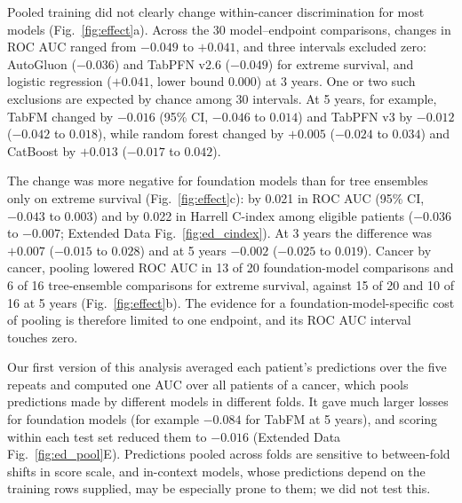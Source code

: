 Pooled training did not clearly change within-cancer discrimination for most models (Fig.~\ref{fig:effect}a). Across the 30 model--endpoint comparisons, changes in ROC AUC ranged from $-0.049$ to $+0.041$, and three intervals excluded zero: AutoGluon ($-0.036$) and TabPFN v2.6 ($-0.049$) for extreme survival, and logistic regression ($+0.041$, lower bound 0.000) at 3 years. One or two such exclusions are expected by chance among 30 intervals. At 5 years, for example, TabFM changed by $-0.016$ (95\% CI, $-0.046$ to $0.014$) and TabPFN v3 by $-0.012$ ($-0.042$ to $0.018$), while random forest changed by $+0.005$ ($-0.024$ to $0.034$) and CatBoost by $+0.013$ ($-0.017$ to $0.042$).

The change was more negative for foundation models than for tree ensembles only on extreme survival (Fig.~\ref{fig:effect}c): by 0.021 in ROC AUC (95\% CI, $-0.043$ to $0.003$) and by 0.022 in Harrell C-index among eligible patients ($-0.036$ to $-0.007$; Extended Data Fig.~\ref{fig:ed_cindex}). At 3 years the difference was $+0.007$ ($-0.015$ to $0.028$) and at 5 years $-0.002$ ($-0.025$ to $0.019$). Cancer by cancer, pooling lowered ROC AUC in 13 of 20 foundation-model comparisons and 6 of 16 tree-ensemble comparisons for extreme survival, against 15 of 20 and 10 of 16 at 5 years (Fig.~\ref{fig:effect}b). The evidence for a foundation-model-specific cost of pooling is therefore limited to one endpoint, and its ROC AUC interval touches zero.

Our first version of this analysis averaged each patient's predictions over the five repeats and computed one AUC over all patients of a cancer, which pools predictions made by different models in different folds. It gave much larger losses for foundation models (for example $-0.084$ for TabFM at 5 years), and scoring within each test set reduced them to $-0.016$ (Extended Data Fig.~\ref{fig:ed_pool}E). Predictions pooled across folds are sensitive to between-fold shifts in score scale, and in-context models, whose predictions depend on the training rows supplied, may be especially prone to them; we did not test this.

